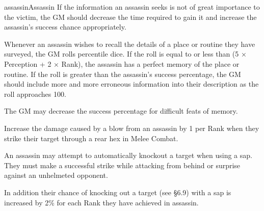 \begin{Skill}{assassin}{Assassin}
If the information an assassin seeks is not of great importance to the
victim, the GM should decrease the time required to gain it and
increase the assassin’s success chance appropriately.


Whenever an assassin wishes to recall the details of a place or
routine they have surveyed, the GM rolls percentile dice.  If the roll
is equal to or less than (5 × Perception + 2 × Rank), the assassin has
a perfect memory of the place or routine. If the roll is greater than
the assassin’s success percentage, the GM should include more and more
erroneous information into their description as the roll approaches
100.

The GM may decrease the success percentage for difficult feats of
memory.



Increase the damage caused by a blow from an assassin by 1 per Rank
when they strike their target through a rear hex in Melee Combat.


An assassin may attempt to automatically knockout a target when using
a sap.  They must make a successful strike while attacking from behind
or surprise against an unhelmeted opponent.

In addition their chance of knocking out a target (see §6.9) with a
sap is increased by 2\% for each Rank they have achieved in assassin.


\end{Skill}
